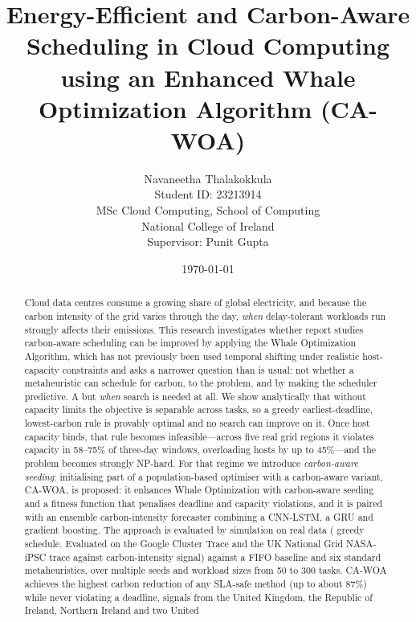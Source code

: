 \documentclass[12pt,a4paper]{article}
\title{\textbf{Energy-Efficient and Carbon-Aware Scheduling in Cloud Computing\\using an Enhanced Whale Optimization Algorithm (CA-WOA)}}
\author{Navaneetha Thalakokkula\\Student ID: 23213914\\MSc Cloud Computing, School of Computing\\National College of Ireland\\Supervisor: Punit Gupta}
\date{\today}
\providecommand{\DIFaddtex}[1]{{\protect\color{blue} \sf #1}} %
\providecommand{\DIFdeltex}[1]{{\protect\color{red} \scriptsize #1}} %
\providecommand{\DIFaddbegin}{} %
\providecommand{\DIFaddend}{} %
\providecommand{\DIFdelbegin}{} %
\providecommand{\DIFdelend}{} %
\providecommand{\DIFadd}[1]{\texorpdfstring{\DIFaddtex{#1}}{#1}} %
\providecommand{\DIFdel}[1]{\texorpdfstring{\DIFdeltex{#1}}{}} %
\providecommand{\DIFscaledelfig}{0.5}
\newlength{\DIFdelgraphicswidth} %
\newlength{\DIFdelgraphicsheight} %
\providecommand{\DIFaddincludegraphics}[2][]{{\color{blue}\fbox{\DIFOincludegraphics[#1]{#2}}}} %
\providecommand{\DIFdelincludegraphics}[2][]{%
\sbox{\DIFdelgraphicsbox}{\DIFOincludegraphics[#1]{#2}}%
\settoboxwidth{\DIFdelgraphicswidth}{\DIFdelgraphicsbox} %
\settoboxtotalheight{\DIFdelgraphicsheight}{\DIFdelgraphicsbox} %
\scalebox{\DIFscaledelfig}{%
\parbox[b]{\DIFdelgraphicswidth}{\usebox{\DIFdelgraphicsbox}\\[-\baselineskip] \rule{\DIFdelgraphicswidth}{0em}}\llap{\resizebox{\DIFdelgraphicswidth}{\DIFdelgraphicsheight}{%
\setlength{\unitlength}{\DIFdelgraphicswidth}%
\begin{picture}(1,1)%
\thicklines\linethickness{2pt} %
{\color[rgb]{1,0,0}\put(0,0){\framebox(1,1){}}}%
{\color[rgb]{1,0,0}\put(0,0){\line( 1,1){1}}}%
{\color[rgb]{1,0,0}\put(0,1){\line(1,-1){1}}}%
\end{picture}%
}\hspace*{3pt}}} %
} %
\DeclareRobustCommand{\DIFaddbegin}{\DIFOaddbegin \let\includegraphics\DIFaddincludegraphics} %
\DeclareRobustCommand{\DIFaddend}{\DIFOaddend \let\includegraphics\DIFOincludegraphics} %
\DeclareRobustCommand{\DIFdelbegin}{\DIFOdelbegin \let\includegraphics\DIFdelincludegraphics} %
\DeclareRobustCommand{\DIFdelend}{\DIFOaddend \let\includegraphics\DIFOincludegraphics} %
\begin{document}
\maketitle

\begin{abstract}
Cloud data centres consume a growing share of global electricity, and because the carbon intensity of the
grid varies through the day, \emph{when} delay-tolerant workloads run strongly affects their emissions. This
\DIFdelbegin \DIFdel{research
investigates whether }\DIFdelend \DIFaddbegin \DIFadd{report studies }\DIFaddend carbon-aware \DIFdelbegin \DIFdel{scheduling can be improved by applying the Whale Optimization Algorithm,
which has not previously been used }\DIFdelend \DIFaddbegin \DIFadd{temporal shifting under realistic host-capacity constraints and asks a narrower
question than is usual: not whether a metaheuristic can schedule }\DIFaddend for carbon, \DIFdelbegin \DIFdel{to the problem, and by making the scheduler predictive. A
}\DIFdelend \DIFaddbegin \DIFadd{but \emph{when} search is needed
at all. We show analytically that without capacity limits the objective is separable across tasks, so a greedy
earliest-deadline, lowest-carbon rule is provably optimal and no search can improve on it. Once host capacity
binds, that rule becomes infeasible---across five real grid regions it violates capacity in 58--75\% of
three-day windows, overloading hosts by up to 45\%---and the problem becomes strongly NP-hard. For that regime
we introduce \emph{carbon-aware seeding}: initialising part of a population-based optimiser with a
}\DIFaddend carbon-aware \DIFdelbegin \DIFdel{variant, CA-WOA, is proposed: it enhances Whale Optimization with carbon-aware seeding and a
fitness function that penalises deadline and capacity
violations, and it is paired with an ensemble
carbon-intensity forecaster combining a CNN-LSTM, a GRU and gradient boosting. The approach is evaluated by
simulation on real data (}\DIFdelend \DIFaddbegin \DIFadd{greedy schedule. Evaluated on }\DIFaddend the Google Cluster Trace and the \DIFdelbegin \DIFdel{UK National Grid }\DIFdelend \DIFaddbegin \DIFadd{NASA-iPSC trace against
}\DIFaddend carbon-intensity \DIFdelbegin \DIFdel{signal)
against
a FIFO baseline and six standard metaheuristics, over multiple seeds and workload sizes from 50 to 300
tasks. CA-WOA achieves the highest carbon reduction of any SLA-safe method (up to about 87\%) while never violating a deadline, }\DIFdelend \DIFaddbegin \DIFadd{signals from the United Kingdom, the Republic of Ireland, Northern Ireland and two United
}
\end{abstract}
\end{document}
